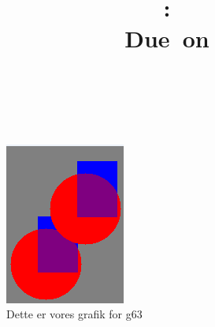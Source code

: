 \documentclass{article}
\title{
\vspace{2in}
\textmd{\textbf{\hmwkClass:\ \hmwkTitle}}\\
\normalsize\vspace{0.1in}\small{Due\ on\ \hmwkDueDate}\\
\vspace{3in}
}
\author{
\textbf{\hmwkAuthorNameJonas}\\
\textbf{\hmwkAuthorNameVic}\\
\textbf{\hmwkAuthorNameMehr}
}
\begin{document}
\maketitle





\clearpage
\begin{figure}[h]
	\centering
	\includegraphics[scale=1.5]{Udklip1.PNG}
	\caption{Dette er vores grafik for g63}
\end{figure}











\end{document}
